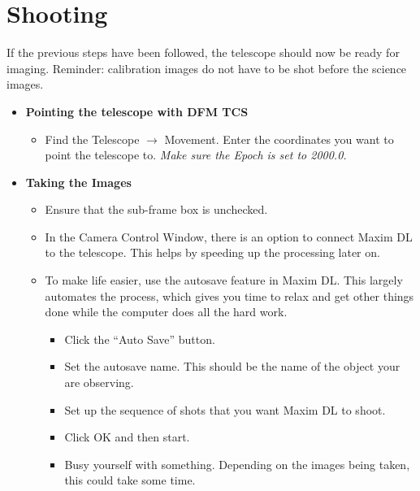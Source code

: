 \documentclass[letterpaper, 12pt]{report}
\begin{document}
\newpage



\chapter{Shooting}\label{ch:5}

If the previous steps have been followed, the telescope should now be ready for imaging. Reminder: calibration images do not have to be shot before the science images.

\begin{itemize}
	\item \large \textbf{Pointing the telescope with DFM TCS}
	\begin{itemize}
		\item Find the Telescope $\rightarrow$ Movement. Enter the coordinates you want to point the telescope to. {\large \emph{Make sure the Epoch is set to 2000.0.}}
	\end{itemize}
	\item \large \textbf{Taking the Images}
	\begin{itemize}
		\item Ensure that the sub-frame box is unchecked.
		\item In the Camera Control Window, there is an option to connect Maxim DL to the telescope. This helps by speeding up the processing later on.
		\item To make life easier, use the autosave feature in Maxim DL. This largely automates the process, which gives you time to relax and get other things done while the computer does all the hard work.
		\begin{itemize}
			\item Click the ``Auto Save'' button.
			\item Set the autosave name. This should be the name of the object your are observing.
			\item Set up the sequence of shots that you want Maxim DL to shoot.
			\item Click OK and then start.
			\item Busy yourself with something. Depending on the images being taken, this could take some time.
		\end{itemize}
	\end{itemize}
\end{itemize}

\newpage
\end{document}
